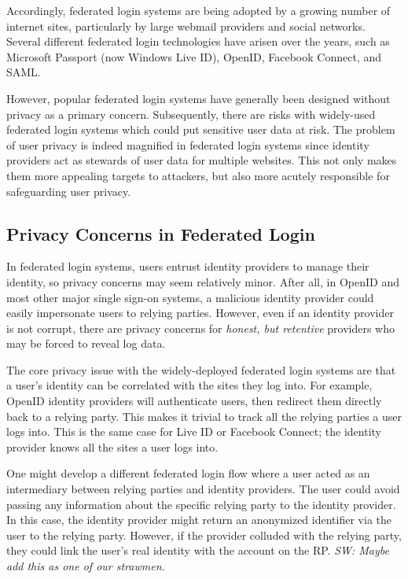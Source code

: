 \documentclass{llncs}
\begin{document}
Accordingly, federated login systems are being adopted by a growing
number of internet sites, particularly by large webmail providers and
social networks.  Several different federated login technologies have
arisen over the years, such as Microsoft Passport (now Windows Live
ID), OpenID, Facebook Connect, and SAML.


However, popular federated login systems have generally been designed
without privacy as a primary concern. Subsequently, there are risks
with widely-used federated login systems which could put sensitive
user data at risk. The problem of user privacy is indeed magnified in
federated login systems since identity providers act as stewards of
user data for multiple websites. This not only makes them more
appealing targets to attackers, but also more acutely responsible for
safeguarding user privacy.

\subsection{Privacy Concerns in Federated Login}

In federated login systems, users entrust identity providers to manage their
identity, so privacy concerns may seem relatively minor. After all, in OpenID
and most other major single sign-on systems, a malicious identity provider could
easily impersonate users to relying parties. However, even if an identity
provider is not corrupt, there are privacy concerns for
\emph{honest, but retentive} providers who may be forced to reveal log data.

The core privacy issue with the widely-deployed federated login systems are that
a user's identity can be correlated with the sites they log into. For example,
OpenID identity providers will authenticate users, then redirect them directly
back to a relying party. This makes it trivial to track all the relying parties
a user logs into. This is the same case for Live ID or Facebook Connect; the
identity provider knows all the sites a user logs into.

One might develop a different federated login flow where a user acted as an
intermediary between relying parties and identity providers. The user could
avoid passing any information about the specific relying party to the identity
provider. In this case, the identity provider might return an anonymized
identifier via the user to the relying party. However, if the provider colluded
with the relying party, they could link the user's real identity with the
account on the RP. \emph{SW: Maybe add this as one of our strawmen.}
\end{document}
